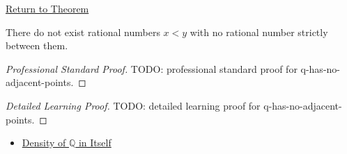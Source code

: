 \newpage
{}
\label{prf:q-has-no-adjacent-points}

\begin{remark*}[Return]
\hyperref[cor:q-has-no-adjacent-points]{Return to Theorem}
\end{remark*}

\begin{corollary*}
There do not exist rational numbers $x<y$ with no rational number strictly
between them.
\end{corollary*}

\begin{proof}[Professional Standard Proof]
\LRAProofBodyStart
TODO: professional standard proof for q-has-no-adjacent-points.
\end{proof}

\begin{proof}[Detailed Learning Proof]
\LRAProofBodyStart
TODO: detailed learning proof for q-has-no-adjacent-points.
\end{proof}

\begin{remark*}
\end{remark*}

\begin{dependencies}
\begin{itemize}
  \item \hyperref[thm:density-of-q]{Density of $\mathbb{Q}$ in Itself}
\end{itemize}
\end{dependencies}

\clearpage
